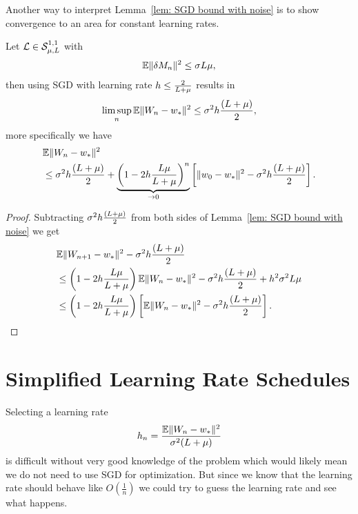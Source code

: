 Another way to interpret Lemma~\ref{lem: SGD bound with noise} is to show
convergence to an area for constant learning rates.
\begin{theorem}
	\label{thm: SGD converges to area}
	Let \(\mathcal{L}\in\mathcal{S}^{1,1}_{{\mu},{L}}\) with
	\begin{align*}
		\mathbb{E}\|\delta M_n\|^2 \le \sigma L\mu,
	\end{align*}
	then using SGD with learning rate \(h\le\frac{2}{L+\mu}\) results in
	\begin{align*}
		\limsup_n\mathbb{E}\|W_n-w_*\|^2
		\le \sigma^2 h\frac{(L+\mu)}{2},
	\end{align*}
	more specifically we have
	\begin{align*}
		&\mathbb{E}\|W_n-w_*\|^2\\
		&\le \sigma^2 h\frac{(L+\mu)}{2}
		+ \underbrace{\left(1-2h\frac{L\mu}{L+\mu}\right)^n}_{\to 0}
		\left[
			\|w_0-w_*\|^2-\sigma^2 h\frac{(L+\mu)}{2}
		\right].
	\end{align*}
\end{theorem}
\begin{proof}
	Subtracting \(\sigma^2 h\frac{(L+\mu)}{2}\) from both sides
	of Lemma~\ref{lem: SGD bound with noise} we get
	\begin{align*}
		&\mathbb{E}\|W_{n+1}-w_*\|^2 - \sigma^2 h\frac{(L+\mu)}{2}\\
		&\le \left(1-2h\frac{L\mu}{L+\mu}\right)
		\mathbb{E}\|W_n-w_*\|^2
		-\sigma^2 h\frac{(L+\mu)}{2} + h^2\sigma^2L\mu\\
		&\le \left(1-2h\frac{L\mu}{L+\mu}\right)
		\left[
			\mathbb{E}\|W_n-w_*\|^2-\sigma^2 h\frac{(L+\mu)}{2}
		\right].
		\qedhere
	\end{align*}
\end{proof}


\section{Simplified Learning Rate Schedules}\label{sec: simplified learning rate schedules}

Selecting a learning rate
\begin{align*}
	h_n = \frac{\mathbb{E}\|W_n - w_*\|^2}{\sigma^2(L+\mu)}
\end{align*}
is difficult without very good knowledge of the problem which would likely mean
we do not need to use SGD for optimization. But since we know that the learning
rate should behave like \(O(\tfrac1n)\) we could try to guess the learning rate
and see what happens.

